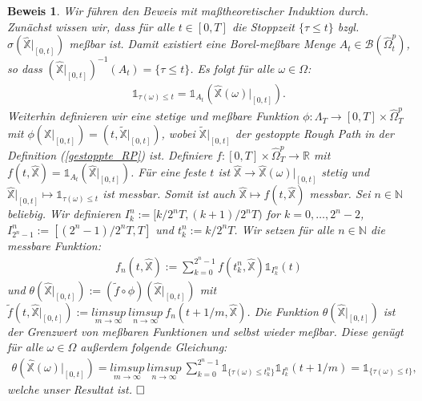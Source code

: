 \documentclass[12pt,titlepage,headsepline]{article}
\newtheorem*{beweis-non}{Beweis}
\begin{document}
      \begin{beweis-non}
        \textup{
        Wir führen den Beweis mit maßtheoretischer Induktion durch. Zunächst wissen wir, dass für alle $t \in [0,T]$ die Stoppzeit $\{ \tau \leq t\}$ bzgl. $\sigma(\hat{\mathbb{X}}\lvert_{[0,t]})$ meßbar ist. Damit existiert eine Borel-meßbare Menge $A_t \in \mathcal{B}(\hat{\Omega}_t^p)$, so dass $(\hat{\mathbb{X}}\lvert_{[0,t]})^{-1}(A_t)=\{ \tau \leq t\}$. Es folgt für alle $\omega \in \Omega$:
        \begin{align*}
          \mathds{1}_{\tau(\omega)\leq t} = \mathds{1}_{A_t}(\hat{\mathbb{X}}(\omega)\lvert_{[0,t]}).
        \end{align*}
        Weiterhin definieren wir eine stetige und meßbare Funktion $\phi : \Lambda_T \rightarrow [0,T] \times \hat{\Omega}_T^p$ mit $\phi(\mathbb{X}\lvert_{[0,t]}) = (t,\tilde{\mathbb{X}}\lvert_{[0,t]})$, wobei $\tilde{\mathbb{X}}\lvert_{[0,t]}$ der gestoppte Rough Path in der Definition (\ref{gestoppte_RP}) ist. Definiere $f: [0,T]\times \hat{\Omega}_T^p \rightarrow \mathbb{R}$ mit $f(t,\hat{\mathbb{X}}) = \mathds{1}_{A_t}(\hat{\mathbb{X}}\lvert_{[0,t]})$. Für eine feste $t$ ist $\hat{\mathbb{X}} \rightarrow \hat{\mathbb{X}}(\omega)\lvert_{[0,t]}$ stetig und $\hat{\mathbb{X}}\lvert_{[0,t]} \mapsto \mathds{1}_{\tau(\omega)\leq t}$ ist messbar. Somit ist auch $\hat{\mathbb{X}} \mapsto f(t,\hat{\mathbb{X}})$ messbar.
        \hfill\break
        Sei $n \in \mathbb{N}$ beliebig. Wir definieren $I^n_k := [k/2^nT,(k+1)/2^nT)$ for $k=0,\ldots,2^n-2$, $I^n_{2^n-1} := [(2^n-1)/2^nT,T]$ und $t^n_k := k/2^nT$. Wir setzen für alle $n \in \mathbb{N}$ die messbare Funktion:
        \begin{align*}
          f_n(t,\hat{\mathbb{X}}) := \sum_{k=0}^{2^n-1} f(t_k^n,\hat{\mathbb{X}})\mathds{1}_{I^n_k}(t)
        \end{align*}
        und $\theta(\hat{\mathbb{X}}\rvert_{[0,t]}) := (\tilde{f}\circ \phi)(\hat{\mathbb{X}}\rvert_{[0,t]})$ mit $\tilde{f}(t,\hat{\mathbb{X}}\rvert_{[0,t]}) := \underset{m \rightarrow \infty}{limsup} \ \underset{n \rightarrow \infty}{limsup} \ f_n(t+1/m,\hat{\mathbb{X}})$. Die Funktion $\theta(\hat{\mathbb{X}}\rvert_{[0,t]})$ ist der Grenzwert von meßbaren Funktionen und selbst wieder meßbar. Diese genügt für alle $\omega \in \Omega$ außerdem folgende Gleichung:
        \begin{align*}
          \theta(\hat{\mathbb{X}}(\omega)\rvert_{[0,t]}) = \underset{m \rightarrow \infty}{limsup} \ \underset{n \rightarrow \infty}{limsup} \ \sum_{k=0}^{2^n-1}\mathds{1}_{\{\tau(\omega)\leq t^n_k\}}\mathds{1}_{I^n_k}(t+1/m)=\mathds{1}_{\{\tau(\omega)\leq t\}},
        \end{align*}
        welche unser Resultat ist.
        }
      $\hfill\Box$
    \end{beweis-non}
\end{document}
